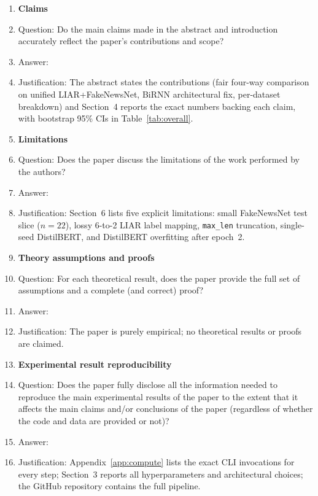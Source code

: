 \documentclass{article}
\begin{document}
\begin{enumerate}

\item {\bf Claims}
    \item[] Question: Do the main claims made in the abstract and introduction accurately reflect the paper's contributions and scope?
    \item[] Answer: \answerYes{}
    \item[] Justification: The abstract states the contributions (fair four-way comparison on unified LIAR+FakeNewsNet, BiRNN architectural fix, per-dataset breakdown) and Section~4 reports the exact numbers backing each claim, with bootstrap 95\% CIs in Table~\ref{tab:overall}.

\item {\bf Limitations}
    \item[] Question: Does the paper discuss the limitations of the work performed by the authors?
    \item[] Answer: \answerYes{}
    \item[] Justification: Section~6 lists five explicit limitations: small FakeNewsNet test slice ($n=22$), lossy 6-to-2 LIAR label mapping, \texttt{max\_len} truncation, single-seed DistilBERT, and DistilBERT overfitting after epoch~2.

\item {\bf Theory assumptions and proofs}
    \item[] Question: For each theoretical result, does the paper provide the full set of assumptions and a complete (and correct) proof?
    \item[] Answer: \answerNA{}
    \item[] Justification: The paper is purely empirical; no theoretical results or proofs are claimed.

\item {\bf Experimental result reproducibility}
    \item[] Question: Does the paper fully disclose all the information needed to reproduce the main experimental results of the paper to the extent that it affects the main claims and/or conclusions of the paper (regardless of whether the code and data are provided or not)?
    \item[] Answer: \answerYes{}
    \item[] Justification: Appendix~\ref{app:compute} lists the exact CLI invocations for every step; Section~3 reports all hyperparameters and architectural choices; the GitHub repository contains the full pipeline.


\end{enumerate}
\end{document}
